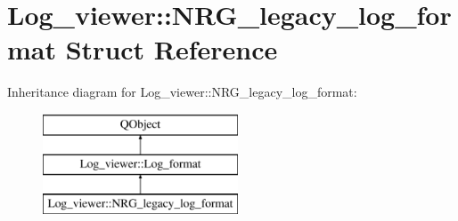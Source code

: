 \hypertarget{struct_log__viewer_1_1_n_r_g__legacy__log__format}{\section{Log\-\_\-viewer\-:\-:N\-R\-G\-\_\-legacy\-\_\-log\-\_\-format Struct Reference}
\label{struct_log__viewer_1_1_n_r_g__legacy__log__format}
}
Inheritance diagram for Log\-\_\-viewer\-:\-:N\-R\-G\-\_\-legacy\-\_\-log\-\_\-format\-:\begin{figure}[H]
\begin{center}
\leavevmode
\includegraphics[height=3.000000cm]{struct_log__viewer_1_1_n_r_g__legacy__log__format}
\end{center}
\end{figure}
